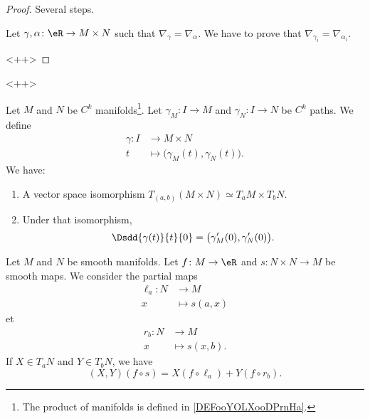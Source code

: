 \begin{proof}
	Several steps.
	\begin{subproof}
		Let \(\gamma,\alpha \colon \eR\to M\times N  \) such that \( \nabla_{\gamma}=\nabla_{\alpha}\). We have to prove that \( \nabla_{\gamma_i}=\nabla_{\alpha_i}\).
	\end{subproof}<++>
\end{proof}<++>


\begin{lemma}       \label{LEMooTONEooFiysTA}
	Let \( M\) and \( N\) be \( C^k\) manifolds\footnote{The product of manifolds is defined in \ref{DEFooYOLXooDPrnHa}.}. Let \( \gamma_M\colon I\to M\) and \( \gamma_N\colon I\to N\) be \( C^k\) paths. We define
	\begin{equation}
		\begin{aligned}
			\gamma\colon I & \to M\times N                                \\
			t              & \mapsto \big( \gamma_M(t),\gamma_N(t) \big).
		\end{aligned}
	\end{equation}
	We have:
	\begin{enumerate}
		\item
		      A vector space isomorphism \( T_{(a,b)}(M\times N)\simeq T_aM\times T_bN\).
		\item
		      Under that isomorphism,
		      \begin{equation}
			      \Dsdd{ \gamma(t) }{t}{0}=\big( \gamma_M'(0),\gamma_N'(0) \big).
		      \end{equation}
	\end{enumerate}
\end{lemma}

\begin{proposition}	\label{PROPooJIFTooGboJoI}
	Let \( M\) and \( N\) be smooth manifolds. Let \(f \colon M\to \eR  \) and \(s \colon N\times N\to M  \) be smooth maps. We consider the partial maps
	\begin{equation}
		\begin{aligned}
			\ell_a\colon N & \to M          \\
			x              & \mapsto s(a,x)
		\end{aligned}
	\end{equation}
	et
	\begin{equation}
		\begin{aligned}
			r_b\colon N & \to M           \\
			x           & \mapsto s(x,b).
		\end{aligned}
	\end{equation}
	If \( X\in T_aN\) and \( Y\in T_bN\), we have
	\begin{equation}
		(X,Y)(f\circ s)=X(f\circ \ell_a)+Y(f\circ r_b).
	\end{equation}
\end{proposition}


